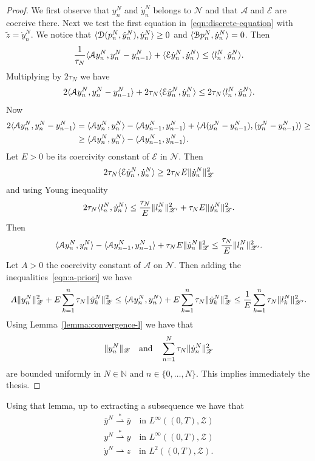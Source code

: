 \begin{proof}
We first observe that $y_n^N$ and $\dot y_n^N$ belongs to $\mathscr{N}$ and that $\mathcal{A}$ and $\mathcal{E}$ are coercive there. Next we test the first equation in~\eqref{eqn:discrete-equation} with $\tilde z=\dot y_n^N$. We notice that $\langle\mathcal{D}(p_n^N,\dot y_n^N),\dot y_n^N\rangle\ge0$ and $\langle\mathcal{B}p_n^N,\dot y_n^N\rangle=0$. Then
\[
\frac{1}{\tau_N}\langle\mathcal{A} y_n^N, y_n^N- y_{n-1}^N\rangle+\langle\mathcal{E}\dot  y_n^N,\dot  y_n^N\rangle\le\langle l_n^N,\dot  y_n^N\rangle.
\]
Multiplying by $2\tau_N$ we have
\[
2\langle\mathcal{A} y_n^N, y_n^N- y_{n-1}^N\rangle+2\tau_N\langle\mathcal{E}\dot  y_n^N,\dot  y_n^N\rangle\le2\tau_N\langle l_n^N,\dot  y_n^N\rangle.
\]
Now
\[
\begin{split}
2\langle\mathcal{A} y_n^N, y_n^N- y_{n-1}^N\rangle&=\langle\mathcal{A} y_n^N, y_n^N\rangle-\langle\mathcal{A} y_{n-1}^N, y_{n-1}^N\rangle+\langle\mathcal{A}( y_n^N- y_{n-1}^N),( y_n^N- y_{n-1}^N)\rangle\ge\\
&\ge\langle\mathcal{A} y_n^N, y_n^N\rangle-\langle\mathcal{A} y_{n-1}^N, y_{n-1}^N\rangle.
\end{split}
\]
Let $E>0$ be its coercivity constant of $\mathcal{E}$ in $\mathscr{N}$. Then
\[
2\tau_N\langle\mathcal{E}\dot  y_n^N,\dot  y_n^N\rangle\ge2\tau_N E\lVert\dot  y_n^N\rVert_\mathscr{Z}^2
\]
and using Young inequality
\[
2\tau_N\langle l_n^N,\dot  y_n^N\rangle\le\frac{\tau_N}{E}\lVert l_n^N\rVert_{\mathscr{Z}'}^2+\tau_N E\lVert\dot  y_n^N\rVert_\mathscr{Z}^2.
\]
Then
\begin{equation}
\label{eqn:a-priori}
\langle\mathcal{A} y_n^N, y_n^N\rangle-\langle\mathcal{A} y_{n-1}^N, y_{n-1}^N\rangle+\tau_N E\lVert\dot  y_n^N\rVert_\mathscr{Z}^2\le\frac{\tau_N}{E}\lVert l_n^N\rVert_{\mathscr{Z}'}^2.
\end{equation}
Let $A>0$ the coercivity constant of $\mathcal{A}$ on $\mathscr{N}$. Then adding the inequalities~\eqref{eqn:a-priori} we have
\[
A\lVert y_n^N\rVert_\mathscr{Z}^2+E\sum_{k=1}^{n}\tau_N\lVert\dot  y_k^N\rVert_\mathscr{Z}^2\le\langle\mathcal{A} y_n^N, y_n^N\rangle+E\sum_{k=1}^{n}\tau_N\lVert\dot  y_k^N\rVert_\mathscr{Z}^2\le\frac{1}{E}\sum_{k=1}^{n}\tau_N\lVert l_k^N\rVert_{\mathscr{Z}'}^2.
\]
Using Lemma~\ref{lemma:convergence-l} we have that
\[
\lVert y_n^N\rVert_\mathscr{Z}\quad\text{and}\quad\sum_{n=1}^{N}\tau_N\lVert\dot y_n^N\rVert_\mathscr{Z}^2
\]
are bounded uniformly in $N\in\mathbb{N}$ and $n\in\{0,\dots,N\}$. This implies immediately the thesis.
\end{proof}
Using that lemma, up to extracting a subsequence we have that
\begin{subequations}
\label{eqn:weak-time-discrete}
\begin{gather}
\bar y^N\overset{*}{\rightharpoonup}\bar y\quad\text{in $L^\infty((0,T),\mathscr{Z})$} \\
y^N\overset{*}{\rightharpoonup}y\quad\text{in $L^\infty((0,T),\mathscr{Z})$} \\
\dot y^N\rightharpoonup z\quad\text{in $L^2((0,T),\mathscr{Z})$}.
\end{gather}
\end{subequations}

